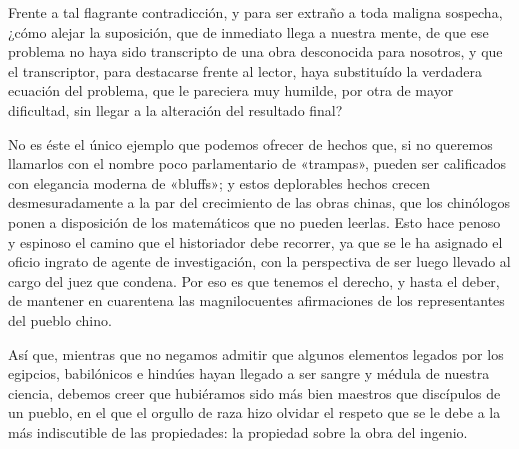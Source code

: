 \documentclass[a4paper, 12pt, draft]{article}
\begin{document}
{Frente a tal flagrante contradicción, y para ser extraño a toda maligna sospecha, ¿cómo alejar la suposición, que de inmediato llega a nuestra mente, de que ese problema no haya sido transcripto de una obra desconocida para nosotros, y que el transcriptor, para destacarse frente al lector, haya substituído la verdadera ecuación del problema, que le pareciera muy humilde, por otra de mayor dificultad, sin llegar a la alteración del resultado final?

No es éste el único ejemplo que podemos ofrecer de hechos que, si no queremos llamarlos con el nombre poco parlamentario de «trampas», pueden ser calificados con elegancia moderna de «bluffs»; y estos deplorables hechos crecen desmesuradamente a la par del crecimiento de las obras chinas, que los chinólogos ponen a disposición de los matemáticos que no pueden leerlas. Esto hace penoso y espinoso el camino que el historiador debe recorrer, ya que se le ha asignado el oficio ingrato de agente de investigación, con la perspectiva de ser luego llevado al cargo del juez que condena. Por eso es que tenemos el derecho, y hasta el deber, de mantener en cuarentena las magnilocuentes afirmaciones de los representantes del pueblo chino.

Así que, mientras que no negamos admitir que algunos elementos legados por los egipcios, babilónicos e hindúes hayan llegado a ser sangre y médula de nuestra ciencia, debemos creer que hubiéramos sido más bien maestros que discípulos de un pueblo, en el que el orgullo de raza hizo olvidar el respeto que se le debe a la más indiscutible de las propiedades: la propiedad sobre la obra del
ingenio.

}
\end{document}
